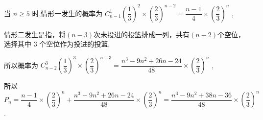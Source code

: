 \begin{enumerate}
\begin{enumerate}
\begin{jieda}
\begin{enumerate}
                当 $n \geq  5$ 时,情形一发生的概率为 ${{C}}_{n - 1}^{1}{\left( \dfrac{1}{3}\right) }^{2} \times  {\left( \dfrac{2}{3}\right) }^{n - 2} = \dfrac{n - 1}{4} \times  {\left( \dfrac{2}{3}\right) }^{n}$ ,
                
                情形二发生是指，将$(n - 3)$次未投进的投篮排成一列，共有$(n - 2)$个空位，选择其中 3 个空位作为投进的投篮,
                
                所以概率为 ${{C}}_{n - 2}^{3}{\left( \dfrac{1}{3}\right) }^{3} \times  {\left( \dfrac{2}{3}\right) }^{n - 3} = \dfrac{{n}^{3} - 9{n}^{2} + {26n} - {24}}{48} \times  {\left( \dfrac{2}{3}\right) }^{n}$ ,
                
                所以 ${P}_{n} = \dfrac{n - 1}{4} \times  {\left( \dfrac{2}{3}\right) }^{n} + \dfrac{{n}^{3} - 9{n}^{2} + {26n} - {24}}{48} \times  {\left( \dfrac{2}{3}\right) }^{n} = \dfrac{{n}^{3} - 9{n}^{2} + {38n} - {36}}{48} \times  {\left( \dfrac{2}{3}\right) }^{n}$ .
                

\end{enumerate}
\end{jieda}
\end{enumerate}
\end{enumerate}
